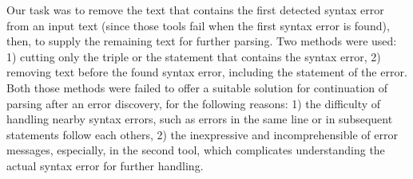 Our task was to remove the text that contains the first detected syntax error from an input text (since those tools fail when the first syntax error is found), then, to supply the remaining text for further parsing. Two methods were used: 1) cutting only the triple or the statement that contains the syntax error, 2) removing text before the found syntax error, including the statement of the error. Both those methods were failed to offer a suitable solution for continuation of parsing after an error discovery, for the following reasons: 1) the difficulty of handling nearby syntax errors, such as errors in the same line or in subsequent statements follow each others, 2) the inexpressive and incomprehensible of error messages, especially, in the second tool, which complicates understanding the actual syntax error for further handling.    





